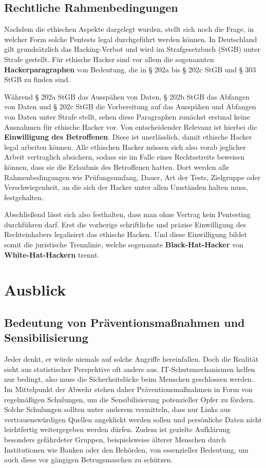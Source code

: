 \documentclass[12pt, a4paper, oneside]{scrartcl}
\begin{document}
\subsection{Rechtliche Rahmenbedingungen}
Nachdem die ethischen Aspekte dargelegt wurden, stellt sich noch die Frage, in welcher Form solche 
Pentests legal durchgeführt werden können. In Deutschland gilt grundsätzlich das Hacking-Verbot und wird 
im Strafgesetzbuch (StGB) unter Strafe gestellt. Für ethische Hacker sind vor allem die  
sogenannten \textbf{Hackerparagraphen} von Bedeutung, die in § 202a bis § 202c StGB und § 303 StGB zu finden sind.
\par
Während § 202a StGB das Ausspähen von Daten, § 202b StGB das Abfangen von Daten und § 202c StGB 
die Vorbereitung auf das Ausspähen und Abfangen von Daten unter Strafe stellt, sehen diese Paragraphen
zunächst erstmal keine Ausnahmen für ethische Hacker vor. Von entscheidender Relevanz ist hierbei 
die \textbf{Einwilligung des Betroffenen}. Diese ist unerlässlich, damit ethische Hacker legal arbeiten können.
Alle ethischen Hacker müssen sich also vorab jeglicher Arbeit vertraglich absichern, sodass sie im 
Falle eines Rechtsstreits beweisen können, dass sie die Erlaubnis des Betroffenen hatten. Dort werden alle
Rahmenbedingungen wie Prüfungsumfang, Dauer, Art der Tests, Zielgruppe oder Verschwiegenheit, an die sich der Hacker 
unter allen Umständen halten muss, festgehalten.
\par
Abschließend lässt sich also festhalten, dass man ohne Vertrag kein Pentesting durchführen darf. Erst die vorherige
schriftliche und präzise Einwilligung des Rechteinhabers legalisiert das ethische Hacken. Und diese Einwilligung
bildet somit die juristische Trennlinie, welche sogenannte \textbf{Black-Hat-Hacker} von \textbf{White-Hat-Hackern} trennt.\\


\section{Ausblick}

\subsection{Bedeutung von Präventionsmaßnahmen und Sensibilisierung}
Jeder denkt, er würde niemals auf solche Angriffe hereinfallen. Doch die Realität sieht aus statistischer Perspektive
oft anders aus. IT-Schutzmechanismen helfen nur bedingt, also muss die Sicherheitslücke beim Menschen
geschlossen werden. Im Mittelpunkt der Abwehr stehen daher Präventionsmaßnahmen in Form von regelmäßigen Schulungen,
um die Sensibilisierung potenzieller Opfer zu fördern.
Solche Schulungen sollten unter anderem vermitteln, dass nur Links aus vertrauenswürdigen Quellen angeklickt werden sollen 
und persönliche Daten nicht leichtfertig weitergegeben werden dürfen. Zudem ist gezielte Aufklärung besonders gefährdeter Gruppen, 
beispielsweise älterer Menschen durch Institutionen wie Banken oder den Behörden, von essenzieller Bedeutung, um auch diese vor 
gängigen Betrugsmaschen zu schützen.
\end{document}
